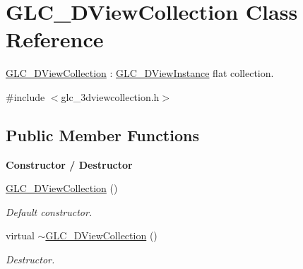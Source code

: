 \hypertarget{class_g_l_c__3_d_view_collection}{\section{G\-L\-C\-\_\-D\-View\-Collection Class Reference}
\label{class_g_l_c__3_d_view_collection}
}


\hyperlink{class_g_l_c__3_d_view_collection}{G\-L\-C\-\_\-D\-View\-Collection} \-: \hyperlink{class_g_l_c__3_d_view_instance}{G\-L\-C\-\_\-D\-View\-Instance} flat collection.  




{\ttfamily \#include $<$glc\-\_\-3dviewcollection.\-h$>$}

\subsection*{Public Member Functions}
\begin{Indent}{\bf Constructor / Destructor}\par
\begin{DoxyCompactItemize}
\item 
\hyperlink{class_g_l_c__3_d_view_collection_a5631dc8833dcedd55bd87d931c999ed6}{G\-L\-C\-\_\-D\-View\-Collection} ()
\begin{DoxyCompactList}\small\item\em Default constructor. \end{DoxyCompactList}\item 
virtual \hyperlink{class_g_l_c__3_d_view_collection_a702d19952af06b0710174d836ae2f006}{$\sim$\-G\-L\-C\-\_\-D\-View\-Collection} ()
\begin{DoxyCompactList}\small\item\em Destructor. \end{DoxyCompactList}\end{DoxyCompactItemize}
\end{Indent}
